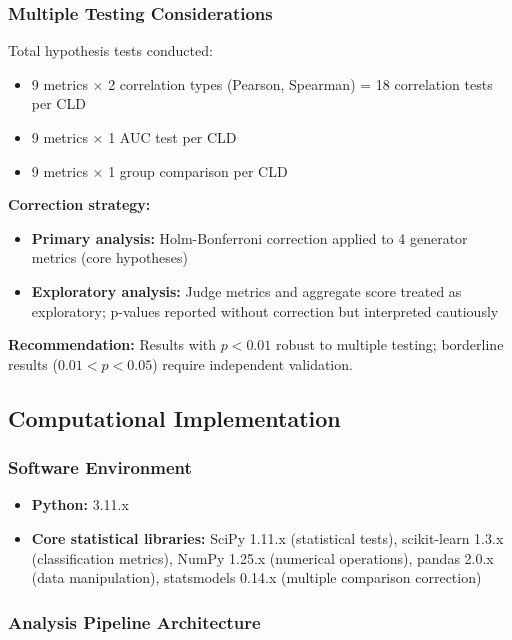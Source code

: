 \subsubsection{Multiple Testing Considerations}

Total hypothesis tests conducted:
\begin{itemize}
    \item 9 metrics \(\times\) 2 correlation types (Pearson, Spearman) = 18 correlation tests per CLD
    \item 9 metrics \(\times\) 1 AUC test per CLD
    \item 9 metrics \(\times\) 1 group comparison per CLD
\end{itemize}

\textbf{Correction strategy:}
\begin{itemize}
    \item \textbf{Primary analysis:} Holm-Bonferroni correction applied to 4 generator metrics (core hypotheses)
    \item \textbf{Exploratory analysis:} Judge metrics and aggregate score treated as exploratory; p-values reported without correction but interpreted cautiously
\end{itemize}

\textbf{Recommendation:} Results with \(p < 0.01\) robust to multiple testing; borderline results (\(0.01 < p < 0.05\)) require independent validation.

\subsection{Computational Implementation}

\subsubsection{Software Environment}

\begin{itemize}
    \item \textbf{Python:} 3.11.x
    \item \textbf{Core statistical libraries:} SciPy 1.11.x (statistical tests), scikit-learn 1.3.x (classification metrics), NumPy 1.25.x (numerical operations), pandas 2.0.x (data manipulation), statsmodels 0.14.x (multiple comparison correction)
\end{itemize}

\subsubsection{Analysis Pipeline Architecture}

